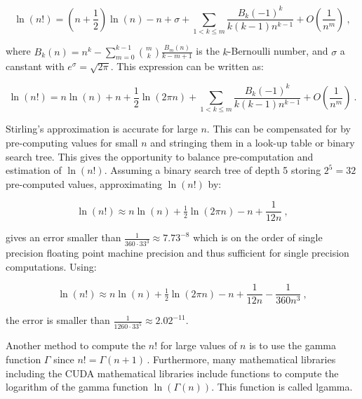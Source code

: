 \documentclass[a4paper]{scrartcl}
\begin{document}
\begin{equation*}
\ln(n!) = (n + \frac{1}{2}) \ln(n) - n + \sigma + \sum_{1 < k \leq m} \frac{B_k(-1)^k}{k (k - 1) n^{k - 1}} + O (\frac{1}{n^m})~,
\end{equation*}

where $B_k(n)=n^{k}-\sum_{m=0}^{k-1}\binom mk\frac{B_m(n)}{k-m+1}$ is the $k$-Bernoulli number, and $\sigma$ a canstant with $e^{\sigma} = \sqrt{2 \pi}$. This expression can be written as:

\begin{equation*}
\ln(n!) = n  \ln(n) + n + \frac{1}{2} \ln (2 \pi n) + \sum_{1 < k \leq m} \frac{B_k(-1)^k}{k (k - 1) n^{k - 1}} + O (\frac{1}{n^m})~.
\end{equation*}

Stirling's approximation is accurate for large $n$. This can be compensated for by pre-computing values for small $n$ and stringing them in a look-up table or binary search tree. This gives the opportunity to balance pre-computation and estimation of $\ln(n!)$.  Assuming a binary search tree of depth 5 storing $2^5 = 32$ pre-computed values, approximating $\ln(n!)$ by:

\begin{equation*}
\ln(n!) \approx n \ln(n) + \tfrac12\ln(2\pi n) - n + \frac1{12 n} ~,
\end{equation*}

gives an error smaller than $\frac1{360 \cdot 33^3} \approx 7.73^{-8}$ which is on the order of single precision floating point machine precision and thus sufficient for single precision computations. Using:

\begin{equation*}
\ln(n!) \approx n \ln(n) + \tfrac12\ln(2\pi n) - n + \frac1{12 n} - \frac1{360 n^3}~,
\end{equation*}

the error is smaller than $\frac{1}{1260 \cdot 33^5} \approx 2.02^{-11}$.

Another method to compute the $n!$ for large values of $n$ is to use the gamma function $\Gamma$ since $n! = \Gamma(n+1)$\,\citep{Bronstein1997}. Furthermore, many mathematical libraries including the CUDA mathematical libraries include functions to compute the logarithm of the gamma function $\ln(\Gamma(n))$. This function is called \textsf{lgamma}.
\end{document}
